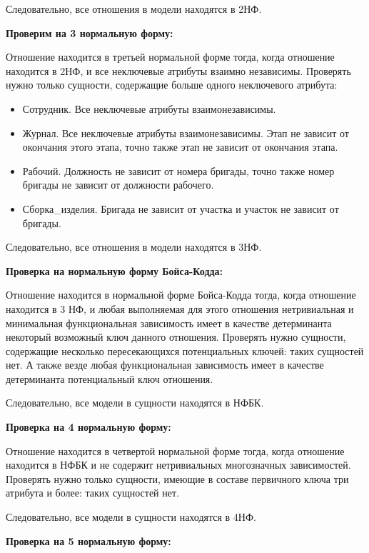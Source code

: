 Следовательно, все отношения в модели находятся в 2НФ.

{\bf Проверим на 3 нормальную форму:}

Отношение находится в третьей нормальной форме тогда, когда отношение находится в 2НФ, и все неключевые атрибуты взаимно независимы.
Проверять нужно только сущности, содержащие больше одного неключевого атрибута:

\begin{itemize}

    \item Сотрудник.
    Все неключевые атрибуты взаимонезависимы.
    \item Журнал.
    Все неключевые атрибуты взаимонезависимы.
    Этап не зависит от окончания этого этапа, точно также этап не зависит от окончания этапа.
    \item Рабочий.
    Должность не зависит от номера бригады, точно также номер бригады не зависит от должности рабочего.
    \item Сборка\_изделия. Бригада не зависит от участка и участок не зависит от бригады.

\end{itemize}

Следовательно, все отношения в модели находятся в 3НФ.

{\bf Проверка на нормальную форму Бойса-Кодда:}

Отношение находится в нормальной форме Бойса-Кодда тогда, когда отношение находится в 3 НФ, и любая выполняемая для этого отношения нетривиальная и минимальная функциональная зависимость имеет в качестве детерминанта некоторый возможный ключ данного отношения.
Проверять нужно сущности, содержащие несколько пересекающихся потенциальных ключей: таких сущностей нет.
А также везде любая функциональная зависимость имеет в качестве детерминанта потенциальный ключ отношения.

Следовательно, все модели в сущности находятся в НФБК.

{\bf Проверка на 4 нормальную форму:}

Отношение находится в четвертой нормальной форме тогда, когда отношение находится в НФБК и не содержит нетривиальных многозначных зависимостей.
Проверять нужно только сущности, имеющие в составе первичного ключа три атрибута и более: таких сущностей нет.


Следовательно, все модели в сущности находятся в 4НФ.

{\bf Проверка на 5 нормальную форму:}

